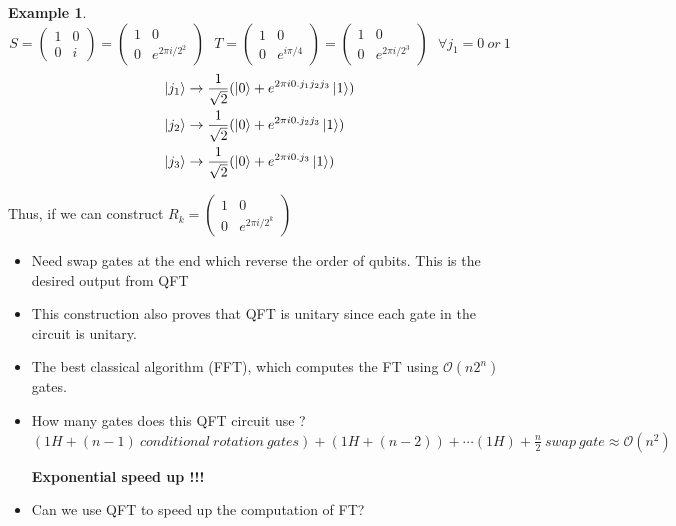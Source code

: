 \documentclass[]{article}
\newtheorem*{example}{Example}
\theoremstyle{nonumberplain}
\begin{document}
\begin{itemize}
\begin{example}
\[{}
\] 
\[
	S = \begin{pmatrix} 1 & 0\\0&i \end{pmatrix} =\begin{pmatrix} 1&0\\0&e^{2\pi i / 2^{2}} \end{pmatrix} \ \ \ T = \begin{pmatrix} 1&0\\0&e^{i\pi/4} \end{pmatrix}   = \begin{pmatrix} 1&0\\0&e^{2\pi i /2^{3}} \end{pmatrix}  \ \ \ \forall  j_{1} = 0 \ or\  1
\] 
\begin{equation*}
\begin{aligned}
	\ket{j_{1}} &\rightarrow \frac{1}{\sqrt{2}}(\ket{0}+e^{2\pi i 0.j_{1}j_{2}j_{3}}\ket{1})\\
	\ket{j_{2}}&\rightarrow \frac{1}{\sqrt{2}}(\ket{0}+e^{2\pi i 0.j_{2}j_{3}}\ket{1}) \\
	\ket{j_{3}}&\rightarrow \frac{1}{\sqrt{2}}(\ket{0}+e^{2\pi i 0.j_{3}}\ket{1}) \\
\end{aligned}
\end{equation*}
\end{example}
	Thus, if we can construct $R_{k}=\begin{pmatrix} 1&0\\0&e^{2\pi i /2^{k}} \end{pmatrix} $
\begin{itemize}
	\item Need swap gates  at the end which reverse the order of qubits. This is the desired output from QFT
	\item This construction also proves that QFT is unitary since each gate in the circuit is unitary.
	\item The best classical algorithm (FFT), which computes the FT using $\mathcal{O}(n2^{n})$ gates.
	\item How many gates does this QFT circuit use ? \\ $(1H+(n-1)\ conditional\ rotation\ gates) + (1H+(n-2)) + \cdots (1H) + \frac{n}{2}\ swap\ gate\approx \mathcal{O}(n^{2})$
	\begin{center}
	\textbf{Exponential speed up !!!}
	\end{center}
	\item Can we use QFT to speed up the computation of FT?\\

\end{itemize}
\end{itemize}
\end{document}
